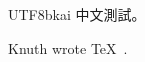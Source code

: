 \documentclass{article}
\begin{document}
\begin{CJK}{UTF8}{bkai}
中文測試。
\end{CJK}
Knuth wrote \TeX~\cite{knuth}.


\end{document}
